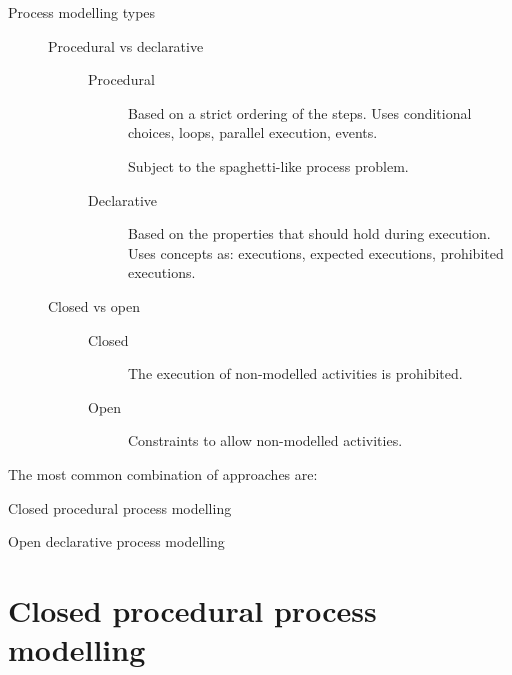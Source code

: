 \begin{description}
    \item[Process modelling types] \phantom{}
        \begin{description}
            \item[Procedural vs declarative] \phantom{}
                \begin{description}
                    \item[Procedural] 
                        Based on a strict ordering of the steps.
                        Uses conditional choices, loops, parallel execution, events. 

                        Subject to the spaghetti-like process problem.

                    \item[Declarative] 
                        Based on the properties that should hold during execution.
                        Uses concepts as: executions, expected executions, prohibited executions.
                \end{description}

            \item[Closed vs open] \phantom{}
                \begin{description}
                    \item[Closed] 
                        The execution of non-modelled activities is prohibited.
                    
                    \item[Open] 
                        Constraints to allow non-modelled activities.
                \end{description}
        \end{description}
\end{description}

The most common combination of approaches are:
\begin{descriptionlist}
    \item[Closed procedural process modelling] 
    \item[Open declarative process modelling] 
\end{descriptionlist}



\section{Closed procedural process modelling}

